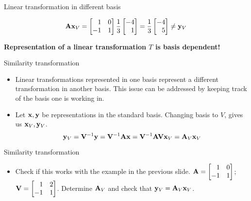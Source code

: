 \documentclass[aspectratio=169]{beamer}
\let\olditem\item
\renewcommand{\item}{\setlength{\itemsep}{\fill}\olditem}
\def\mf{\ensuremath\mathbf}
\begin{document}
\begin{frame}[t]{Linear transformation in different basis}
\begin{small}
\[ \mf{A}\mf{x}_V = \begin{bmatrix*}[r]1 & 0\\-1 & 1\end{bmatrix*}\frac{1}{3}\begin{bmatrix*}[r]-4\\1\end{bmatrix*} = \frac{1}{3}\begin{bmatrix*}[r]-4\\5\end{bmatrix*} \neq \mf{y}_V \]

\textbf{Representation of a linear transformation $T$ is basis dependent! }
\end{small}

\end{frame}


\begin{frame}[t]{Similarity transformation}
\begin{itemize}
    \item Linear transformations represented in one basis represent a different transformation in another basis. This issue can be addressed by keeping track of the basis one is working in.

    \item Let $\mf{x}, \mf{y}$ be representations in the standard basis. Changing basis to $V$, gives us $\mf{x}_V, \mf{y}_V$.
    \[ \mf{y}_V = \mf{V}^{-1}\mf{y} = \mf{V}^{-1}\mf{Ax} = \mf{V}^{-1}\mf{A}\mf{V}\mf{x}_V = \mf{A}_V\mf{x}_V \]
\end{itemize}
\end{frame}


\begin{frame}[t]{Similarity transformation}
\begin{itemize}
    \item Check if this works with the example in the previous slide. $\mf{A} = \begin{bmatrix*}[r]1 & 0\\-1 & 1\end{bmatrix*}$; $\mf{V} = \begin{bmatrix*}[r]1 & 2\\-1 & 1\end{bmatrix*}$. Determine $\mf{A}_V$ and check that $\mf{y}_V = \mf{A}_V\mf{x}_V$.

\end{itemize}
\end{frame}
\end{document}
